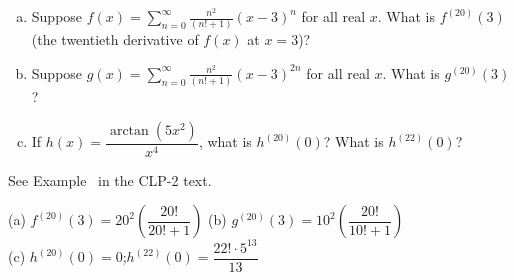 \begin{Mquestion}
\begin{enumerate}[(a)]
\item Suppose $f(x)=\displaystyle\sum_{n=0}^\infty \frac{n^2}{(n!+1)}(x-3)^n$ for all real $x$. What is $f^{(20)}(3)$ (the twentieth derivative of $f(x)$ at $x=3$)?
\item Suppose $g(x)=\displaystyle\sum_{n=0}^\infty \frac{n^2}{(n!+1)}(x-3)^{2n}$ for all real $x$. What is $g^{(20)}(3)$?
\item If $h(x)=\dfrac{\arctan(5x^2)}{x^4}$, what is $h^{(20)}(0)$? What is $h^{(22)}(0)$?
\end{enumerate}
\end{Mquestion}
\begin{hint}
See Example~ in the CLP-2 text.
\end{hint}
\begin{answer}
(a) $f^{(20)}(3)=20^2\left(\dfrac{20!}{20!+1}\right)$\qquad
(b) $g^{(20)}(3)=10^2\left(\dfrac{20!}{10!+1}\right)$\\
(c) $h^{(20)}(0)=0$;\quad $h^{(22)}(0)=\dfrac{22!\cdot 5^{13}}{13}$
\end{answer}
